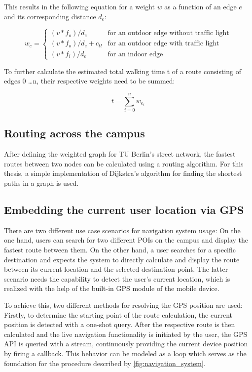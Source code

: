This results in the following equation for a weight $w$ as a function of an edge $e$ and its corresponding distance $d_{e}$:

\[
	w_{e}=\left\{
	\begin{array}{ll}
		(v * f_{o}) / d_{e} 			& \mbox{for an outdoor edge without traffic light} 	\\
		(v * f_{o}) / d_{e} + c_{tl} 	& \mbox{for an outdoor edge with traffic light} 	\\
		(v * f_{i}) / d_{e} 			& \mbox{for an indoor edge}
	\end{array}\right.
 \]

To further calculate the estimated total walking time t of a route consisting of edges 0 \ldots n, their respective weights need to be summed:

\[
	t = \sum_{i=0}^{n} w_{e_{i}}
\]

\subsection{Routing across the campus}
After defining the weighted graph for TU Berlin's street network, the fastest routes between two nodes can be calculated using a routing algorithm. For this thesis, a simple implementation of Dijkstra's algorithm for finding the shortest paths in a graph \cite{dijkstras_algorithm} is used.

\subsection{Embedding the current user location via GPS}
There are two different use case scenarios for navigation system usage: On the one hand, users can search for two different POIs on the campus and display the fastest route between them. On the other hand, a user searches for a specific destination and expects the system to directly calculate and display the route between its current location and the selected destination point. The latter scenario needs the capability to detect the user's current location, which is realized with the help of the built-in GPS module of the mobile device.

To achieve this, two different methods for resolving the GPS position are used: Firstly, to determine the starting point of the route calculation, the current position is detected with a one-shot query. After the respective route is then calculated and the live navigation functionality is initiated by the user, the GPS API is queried with a stream, continuously providing the current device position by firing a callback. This behavior can be modeled as a loop which serves as the foundation for the procedure described by \ref{fig:navigation_system}.

